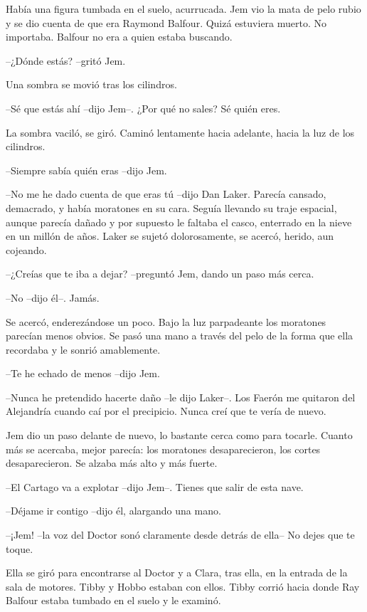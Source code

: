 {Había una figura tumbada en el suelo, acurrucada. Jem vio la mata de
 pelo rubio y se dio cuenta de que era Raymond Balfour. Quizá estuviera
muerto. No importaba. Balfour no era a quien estaba buscando.}

{--¿Dónde estás? --gritó Jem.}

{Una sombra se movió tras los cilindros.}

{--Sé que estás ahí --dijo Jem--. ¿Por qué no sales? Sé quién eres.}

{La sombra vaciló, se giró. Caminó lentamente hacia adelante, hacia la
luz de los cilindros.}

{--Siempre sabía quién eras --dijo Jem.}

{--No me he dado cuenta de que eras tú --dijo Dan Laker. Parecía cansado,
 demacrado, y había moratones en su cara. Seguía llevando su traje
 espacial, aunque parecía dañado y por supuesto le faltaba el casco,
 enterrado en la nieve en un millón de años. Laker se sujetó
dolorosamente, se acercó, herido, aun cojeando.}

{--¿Creías que te iba a dejar? --preguntó Jem, dando un paso más cerca.}

{--No --dijo él--. Jamás.}

{Se acercó, enderezándose un poco. Bajo la luz parpadeante los moratones
 parecían menos obvios. Se pasó una mano a través del pelo de la forma
que ella recordaba y le sonrió amablemente.}

{--Te he echado de menos --dijo Jem.}

{--Nunca he pretendido hacerte daño --le dijo Laker--. Los Faerón me
 quitaron del Alejandría cuando caí por el precipicio. Nunca creí que te
vería de nuevo.}

{Jem dio un paso delante de nuevo, lo bastante cerca como para tocarle.
 Cuanto más se acercaba, mejor parecía: los moratones desaparecieron, los
cortes desaparecieron. Se alzaba más alto y más fuerte.}

{--El Cartago va a explotar --dijo Jem--. Tienes que salir de esta
nave.}

{--Déjame ir contigo --dijo él, alargando una mano.}

{--¡Jem! --la voz del Doctor sonó claramente desde detrás de ella-- No
dejes que te toque.}

{Ella se giró para encontrarse al Doctor y a Clara, tras ella, en la
 entrada de la sala de motores. Tibby y Hobbo estaban con ellos. Tibby
 corrió hacia donde Ray Balfour estaba tumbado en el suelo y le
examinó.}

